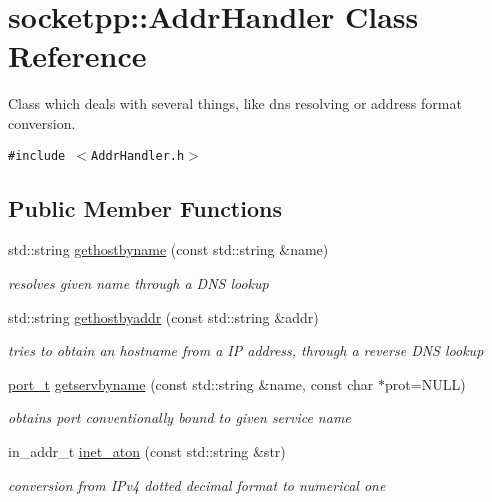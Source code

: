 \hypertarget{classsocketpp_1_1AddrHandler}{
\section{socketpp::AddrHandler Class Reference}
\label{classsocketpp_1_1AddrHandler}
}
Class which deals with several things, like dns resolving or address format conversion.  


{\tt \#include $<$AddrHandler.h$>$}

\subsection*{Public Member Functions}
\begin{CompactItemize}
\item 
std::string \hyperlink{classsocketpp_1_1AddrHandler_19aebc1e9779dee4e5f06d7b39e18959}{gethostbyname} (const std::string \&name)
\begin{CompactList}\small\item\em resolves given name through a DNS lookup \item\end{CompactList}\item 
std::string \hyperlink{classsocketpp_1_1AddrHandler_2e9b9e6dc7ea4fc4a3500665b3f4062d}{gethostbyaddr} (const std::string \&addr)
\begin{CompactList}\small\item\em tries to obtain an hostname from a IP address, through a reverse DNS lookup \item\end{CompactList}\item 
\hyperlink{namespacesocketpp_5517ef80f249b891a2ba64b95fc1e723}{port\_\-t} \hyperlink{classsocketpp_1_1AddrHandler_b4a42f2b0f3842d681ea0cbe6810d6ff}{getservbyname} (const std::string \&name, const char $\ast$prot=NULL)
\begin{CompactList}\small\item\em obtains port conventionally bound to given service name \item\end{CompactList}\item 
in\_\-addr\_\-t \hyperlink{classsocketpp_1_1AddrHandler_e2eda37cd4c20059c557e4e65c829cf8}{inet\_\-aton} (const std::string \&str)
\begin{CompactList}\small\item\em conversion from IPv4 dotted decimal format to numerical one \item\end{CompactList}\item 

\end{CompactItemize}
